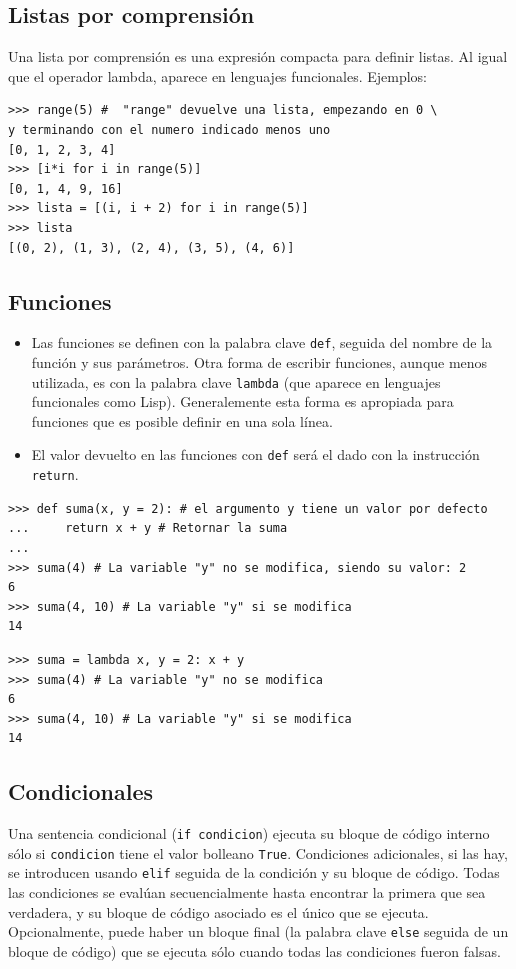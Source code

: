 \subsection{Listas por comprensión}
Una lista por comprensión es una expresión compacta para definir listas. Al igual que el operador lambda, aparece en lenguajes funcionales. Ejemplos:


\begin{lstlisting}
>>> range(5) #  "range" devuelve una lista, empezando en 0 \
y terminando con el numero indicado menos uno
[0, 1, 2, 3, 4]
>>> [i*i for i in range(5)]
[0, 1, 4, 9, 16]
>>> lista = [(i, i + 2) for i in range(5)]
>>> lista
[(0, 2), (1, 3), (2, 4), (3, 5), (4, 6)]
\end{lstlisting}



\subsection{Funciones}
\begin{itemize}

  \item  Las funciones se definen con la palabra clave \verb~def~, seguida del nombre de la función y sus parámetros. Otra forma de escribir funciones, aunque menos utilizada, es con la palabra clave \verb~lambda~ (que aparece en lenguajes funcionales como Lisp). Generalemente esta forma es apropiada para funciones que es posible definir en una sola línea.

  \item  El valor devuelto en las funciones con \verb~def~ será el dado con la instrucción \verb~return~.
  \end{itemize}


\begin{lstlisting}
>>> def suma(x, y = 2): # el argumento y tiene un valor por defecto
...     return x + y # Retornar la suma
...
>>> suma(4) # La variable "y" no se modifica, siendo su valor: 2
6
>>> suma(4, 10) # La variable "y" si se modifica
14
\end{lstlisting}


\begin{lstlisting}
>>> suma = lambda x, y = 2: x + y
>>> suma(4) # La variable "y" no se modifica
6
>>> suma(4, 10) # La variable "y" si se modifica
14
\end{lstlisting}

\subsection{Condicionales}
 Una sentencia condicional (\verb~if condicion~) ejecuta su bloque de código interno sólo si \verb~condicion~ tiene el valor bolleano \verb~True~.  Condiciones adicionales, si las hay, se introducen usando \verb~elif~ seguida de la condición y su bloque de código. Todas las condiciones se evalúan secuencialmente hasta encontrar la primera que sea verdadera, y su bloque de código asociado es el único que se ejecuta. Opcionalmente, puede haber un bloque final (la palabra clave \verb~else~ seguida de un bloque de código) que se ejecuta sólo cuando todas las condiciones fueron falsas.



